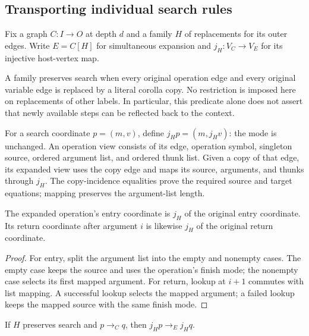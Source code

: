 \subsection{Transporting individual search rules}
Fix a graph $C:I\to O$ at depth $d$ and a family $H$ of replacements for its
outer edges. Write $E=C[H]$ for simultaneous expansion and
$j_H:V_C\to V_E$ for its injective host-vertex map.
\begin{definition}\label{term:search-preserving}
A family preserves search when every original operation edge and every original
variable edge is replaced by a literal corolla copy. No restriction is imposed
here on replacements of other labels. In particular, this predicate alone does
not assert that newly available steps can be reflected back to the context.
\end{definition}
For a search coordinate $p=(m,v)$, define $j_Hp=(m,j_Hv)$: the mode is unchanged.
An operation view consists of its edge, operation symbol, singleton source,
ordered argument list, and ordered thunk list. Given a copy of that edge, its
expanded view uses the copy edge and maps its source, arguments, and thunks
through $j_H$. The copy-incidence equalities prove the required source and
target equations; mapping preserves the argument-list length.
\begin{lemma}
The expanded operation's entry coordinate is $j_H$ of the original entry
coordinate. Its return coordinate after argument $i$ is likewise $j_H$ of the
original return coordinate.
\end{lemma}
\begin{proof}
For entry, split the argument list into the empty and nonempty cases. The empty
case keeps the source and uses the operation's finish mode; the nonempty case
selects its first mapped argument. For return, lookup at $i+1$ commutes with
list mapping. A successful lookup selects the mapped argument; a failed lookup
keeps the mapped source with the same finish mode.
\end{proof}
\begin{theorem}
If $H$ preserves search and $p\longrightarrow_C q$, then
$j_Hp\longrightarrow_E j_Hq$.
\end{theorem}
